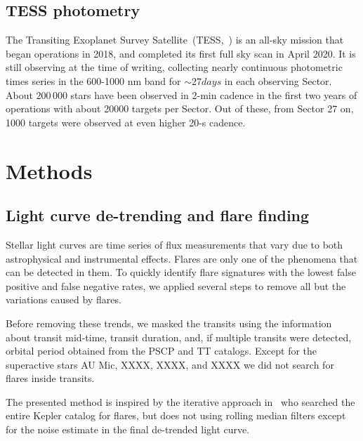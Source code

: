 \documentclass[fleqn,usenatbib,letters]{mnras}%
\begin{document}
\subsection{TESS photometry}
The Transiting Exoplanet Survey Satellite~(TESS,~\citealt{ricker2014}) is an all-sky mission that began operations in 2018, and completed its first full sky scan in April 2020. It is still observing at the time of writing, collecting nearly continuous photometric times series in the 600-1000 nm band for $\sim 27 days$ in each observing Sector. About $200\,000$ stars have been observed in 2-min cadence in the first two years of operations with about 20000 targets per Sector. Out of these, from Sector 27 on, 1000 targets were observed at even higher 20-s cadence. 


\section{Methods}
\subsection{Light curve de-trending and flare finding}
\label{sec:detrendfind}
Stellar light curves are time series of flux measurements that vary due to both astrophysical and instrumental effects. Flares are only one of the phenomena that can be detected in them. To quickly identify flare signatures with the lowest false positive and false negative rates, we applied several steps to remove all but the variations caused by flares.

Before removing these trends, we masked the transits using the information about transit mid-time, transit duration, and, if multiple transits were detected, orbital period obtained from the PSCP and TT catalogs. Except for the superactive stars AU Mic, XXXX, XXXX, and XXXX we did not search for flares inside transits. %

The presented method is inspired by the iterative approach in~\citet{davenport2016} who searched the entire Kepler catalog for flares, but does not using rolling median filters except for the noise estimate in the final de-trended light curve. 
\end{document}
